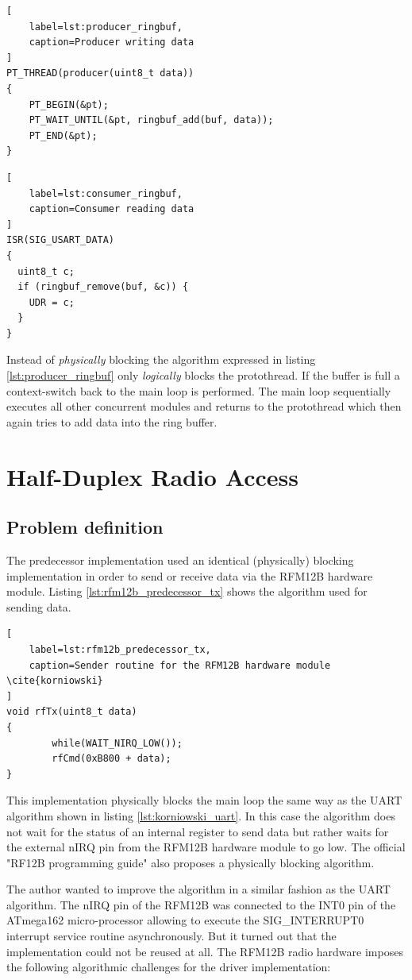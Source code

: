 \begin{lstlisting}[
    label=lst:producer_ringbuf,
    caption=Producer writing data
]
PT_THREAD(producer(uint8_t data))
{
    PT_BEGIN(&pt);
    PT_WAIT_UNTIL(&pt, ringbuf_add(buf, data));
    PT_END(&pt);
}
\end{lstlisting}

\begin{lstlisting}[
    label=lst:consumer_ringbuf,
    caption=Consumer reading data
]
ISR(SIG_USART_DATA)
{
  uint8_t c;
  if (ringbuf_remove(buf, &c)) {
    UDR = c;
  }
}
\end{lstlisting}

Instead of \emph{physically} blocking the algorithm expressed in listing \ref{lst:producer_ringbuf} only \emph{logically} blocks the protothread. If the buffer is full a context-switch back to the main loop is performed. The main loop sequentially executes all other concurrent modules and returns to the protothread which then again tries to add data into the ring buffer.

\section{Half-Duplex Radio Access}%
\label{sec:petri}
\subsection{Problem definition} %
The predecessor implementation used an identical (physically) blocking implementation in order to send or receive data via the RFM12B hardware module. Listing \ref{lst:rfm12b_predecessor_tx} shows the algorithm used for sending data.

\begin{lstlisting}[
    label=lst:rfm12b_predecessor_tx,
    caption=Sender routine for the RFM12B hardware module \cite{korniowski}
]
void rfTx(uint8_t data)
{
        while(WAIT_NIRQ_LOW());
        rfCmd(0xB800 + data);
}
\end{lstlisting}

This implementation physically blocks the main loop the same way as the UART algorithm shown in listing \ref{lst:korniowski_uart}. In this case the algorithm does not wait for the status of an internal register to send data but rather waits for the external nIRQ pin from the RFM12B hardware module to go low. The official "RF12B programming guide" \cite{rf12b_programming_guide} also proposes a physically blocking algorithm.

The author wanted to improve the algorithm in a similar fashion as the UART algorithm. The nIRQ pin of the RFM12B was connected to the INT0 pin of the ATmega162 micro-processor allowing to execute the SIG\_INTERRUPT0 interrupt service routine asynchronously. But it turned out that the implementation could not be reused at all. The RFM12B radio hardware imposes the following algorithmic challenges for the driver implementation:

